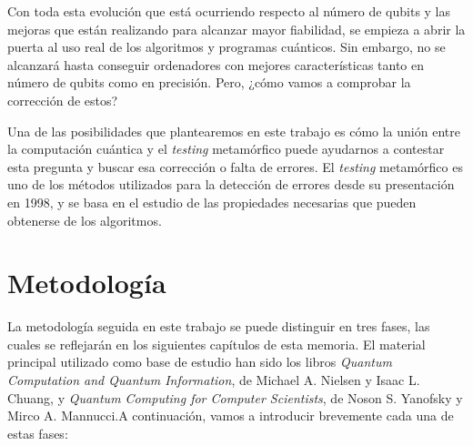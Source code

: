 Con toda esta evolución que está ocurriendo respecto al número de qubits y las mejoras que están realizando para alcanzar mayor fiabilidad, se empieza a abrir la puerta al uso real de los algoritmos y programas cuánticos. Sin embargo, no se alcanzará hasta conseguir ordenadores con mejores características tanto en número de qubits como en precisión. Pero, ¿cómo vamos a comprobar la corrección de estos?

\vspace{10pt}

Una de las posibilidades que plantearemos en este trabajo es cómo la unión entre la computación cuántica y el \textit{testing} metamórfico puede ayudarnos a contestar esta pregunta y buscar esa corrección o falta de errores. El \textit{testing} metamórfico es uno de los métodos utilizados para la detección de errores desde su presentación en 1998\cite{Note:MT:1998}, y se basa en el estudio de las propiedades necesarias que pueden obtenerse de los algoritmos.

\section{Metodología}
\label{Sec1.1:Metodologia}

La metodología seguida en este trabajo se puede distinguir en tres fases, las cuales se reflejarán en los siguientes capítulos de esta memoria. El material principal utilizado como base de estudio han sido los libros \textit{Quantum Computation and Quantum Information}, de Michael A. Nielsen y Isaac L. Chuang\cite{B:Nielsen:2002}, y \textit{Quantum Computing for Computer Scientists}, de Noson S. Yanofsky y Mirco A. Mannucci\cite{B:QuantumScientist:2008}.A continuación, vamos a introducir brevemente cada una de estas fases: 

